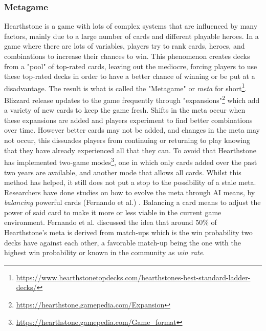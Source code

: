 \documentclass{report} %
\begin{document}
	\subsubsection{Metagame}
	Hearthstone is a game with lots of complex systems that are influenced by many factors, mainly due to a large number of cards and different playable heroes. In a game where there are lots of variables, players try to rank cards, heroes, and combinations to increase their chances to win. This phenomenon creates decks from a "pool" of top-rated cards, leaving out the mediocre, forcing players to use these top-rated decks in order to have a better chance of winning or be put at a disadvantage. The result is what is called the "Metagame" or {\it{meta}} for short\footnote{\url{https://www.hearthstonetopdecks.com/hearthstones-best-standard-ladder-decks/}}. Blizzard release updates to the game frequently through "expansions"\footnote{\url{https://hearthstone.gamepedia.com/Expansion}} which add a variety of new cards to keep the game fresh. Shifts in the meta occur when these expansions are added and players experiment to find better combinations over time. However better cards may not be added, and changes in the meta may not occur, this dissuades players from continuing or returning to play knowing that they have already experienced all that they can. To avoid that Hearthstone has implemented two-game modes\footnote{\url{https://hearthstone.gamepedia.com/Game_format}}, one in which only cards added over the past two years are available, and another mode that allows all cards. Whilst this method has helped, it still does not put a stop to the possibility of a stale meta. Researchers have done studies on how to evolve the meta through AI means, by {\it{balancing}} powerful cards ({Fernando et al.}) \cite{EvolveMeta}. Balancing a card means to adjust the power of said card to make it more or less viable in the current game environment. Fernando et al. discussed the idea that around 50\% of Hearthstone's meta is derived from match-ups which is the win probability two decks have against each other, a favorable match-up being the one with the highest win probability or known in the community as {\it{win rate}}.  
\end{document}
